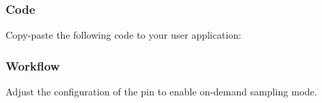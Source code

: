 \hypertarget{asfdoc_sam0_system_pinmux_basic_use_case_asfdoc_sam0_system_pinmux_basic_use_case_code}{}\subsubsection{Code}\label{asfdoc_sam0_system_pinmux_basic_use_case_asfdoc_sam0_system_pinmux_basic_use_case_code}
Copy-\/paste the following code to your user application\+: 
\begin{DoxyCodeInclude}
\end{DoxyCodeInclude}
 \hypertarget{asfdoc_sam0_system_pinmux_basic_use_case_asfdoc_sam0_system_pinmux_basic_use_case_flow}{}\subsubsection{Workflow}\label{asfdoc_sam0_system_pinmux_basic_use_case_asfdoc_sam0_system_pinmux_basic_use_case_flow}

\begin{DoxyEnumerate}
\item Adjust the configuration of the pin to enable on-\/demand sampling mode. 
\begin{DoxyCodeInclude}
\end{DoxyCodeInclude}

\end{DoxyEnumerate}